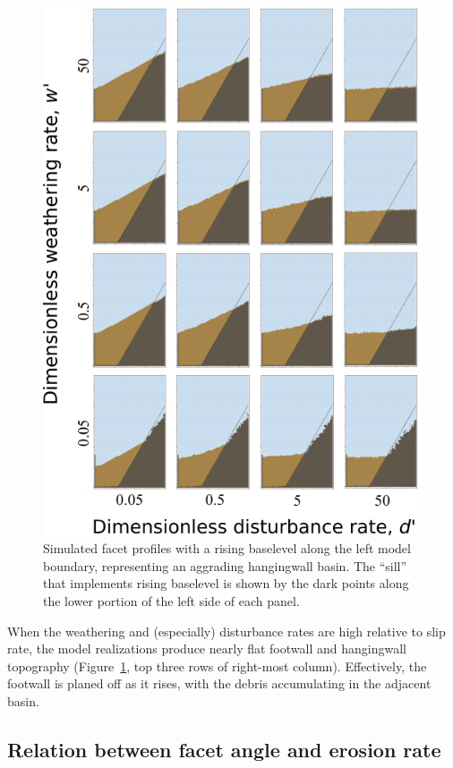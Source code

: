 \begin{figure}[ht!]
\centerline{\includegraphics[scale=1.5]{Figures/four_by_four_profiles_baselevel_rise.pdf}}
\caption{Simulated facet profiles with a rising baselevel along the left model boundary, representing an aggrading hangingwall basin. The ``sill'' that implements rising baselevel is shown by the dark points along the lower portion of the left side of each panel.}
\label{fig:baselevelrise}
\end{figure}

When the weathering and (especially) disturbance rates are high relative to slip rate, the model realizations produce nearly flat footwall and hangingwall topography (Figure~\ref{fig:baselevelrise}, top three rows of right-most column). Effectively, the footwall is planed off as it rises, with the debris accumulating in the adjacent basin.

\subsection{Relation between facet angle and erosion rate}

